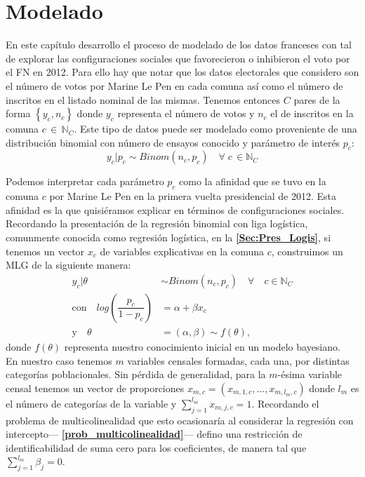 \chapter{Modelado}

En este capítulo desarrollo el proceso de modelado de los datos franceses con tal de explorar las configuraciones sociales que favorecieron o inhibieron el voto por el FN en 2012. Para ello hay que notar que los datos electorales que considero son el número de votos por Marine Le Pen en cada comuna así como el número de inscritos en el listado nominal de las mismas. Tenemos entonces $C$ pares de la forma $\left\lbrace y_c, n_c \right\rbrace$ donde $y_c$ representa el número de votos y $n_c$ el de inscritos en la comuna $c \,\in\,\mathbb{N}_C$. Este tipo de datos puede ser modelado como proveniente de una distribución binomial con número de ensayos conocido y parámetro de interés $p_c$: 
\begin{equation*}
y_c|p_c \sim Binom(n_c, p_c) \quad \forall \; c \, \in \mathbb{N}_C
\end{equation*} 

Podemos interpretar cada parámetro $p_c$ como la afinidad que se tuvo en la comuna $c$ por Marine Le Pen en la primera vuelta presidencial de 2012. Esta afinidad es la que quisiéramos explicar en términos de configuraciones sociales.\\

Recordando la presentación de la regresión binomial con liga logística, comunmente conocida como regresión logística, en la \textbf{\autoref{Sec:Pres_Logis}}, si tenemos un vector $x_c$ de variables explicativas en la comuna $c$, construimos un MLG de la siguiente manera: 
\begin{align*}
y_c|\theta & \sim Binom(n_c,p_c) \quad \forall \quad c \in \mathbb{N}_C \\
\text{con} \quad log\left(\dfrac{p_c}{1-p_c}\right) &= \alpha + \beta x_c \nonumber \\
\text{y} \quad \theta &= (\alpha,\beta) \sim f(\theta),
\end{align*}
donde $f(\theta)$ representa nuestro conocimiento inicial en un modelo bayesiano.\\ 

En nuestro caso tenemos $m$ variables censales formadas, cada una, por distintas categorías poblacionales. Sin pérdida de generalidad, para la $m$-ésima variable censal tenemos un vector de proporciones $x_{m,c}=(x_{m,1,c},\dots,x_{m,l_m,c})$ donde $l_m$ es el número de categorías de la variable y $\sum\limits_{j=1}^{l_m} x_{m,j,c}=1$. Recordando el problema de multicolinealidad que esto ocasionaría al considerar la regresión con intercepto--- \textbf{\autoref{prob_multicolinealidad}}--- defino una restricción de identificabilidad de suma cero para los coeficientes, de manera tal que $\sum\limits_{j=1}^{l_m}\beta_j=0$.\\

